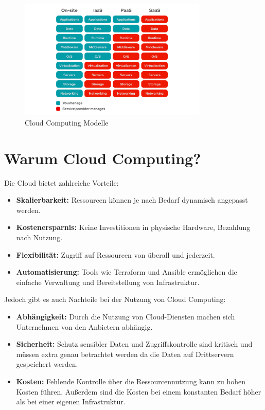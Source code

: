 \begin{figure}[H]
    \centering
    \includegraphics[width=0.8\textwidth]{resources/images/cloudcomputingtiers.png}
    \caption{Cloud Computing Modelle}
\end{figure}

\section{Warum Cloud Computing?}
Die Cloud bietet zahlreiche Vorteile:
\begin{itemize}
    \item \textbf{Skalierbarkeit:} Ressourcen können je nach Bedarf dynamisch angepasst werden.
    \item \textbf{Kostenersparnis:} Keine Investitionen in physische Hardware, Bezahlung nach Nutzung.
    \item \textbf{Flexibilität:} Zugriff auf Ressourcen von überall und jederzeit.
    \item \textbf{Automatisierung:} Tools wie Terraform und Ansible ermöglichen die einfache Verwaltung und Bereitstellung von Infrastruktur.
\end{itemize}\cite{ProCloud}
\newpage


Jedoch gibt es auch Nachteile bei der Nutzung von Cloud Computing:
\begin{itemize}
    \item \textbf{Abhängigkeit:} Durch die Nutzung von Cloud-Diensten machen sich Unternehmen von den Anbietern abhängig.
    \item \textbf{Sicherheit:} Schutz sensibler Daten und Zugriffskontrolle sind kritisch und müssen extra genau betrachtet werden da die Daten auf Drittservern gespeichert werden.
    \item \textbf{Kosten:} Fehlende Kontrolle über die Ressourcennutzung kann zu hohen Kosten führen. Außerdem sind die Kosten bei einem konstanten Bedarf höher als bei einer eigenen Infrastruktur. 
\end{itemize}
\cite{CloudcomputingCarticle}

